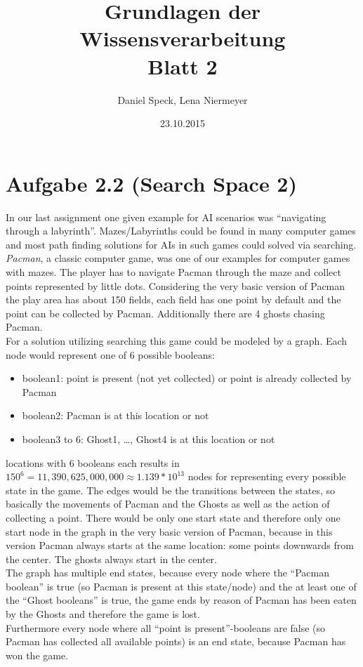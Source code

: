 \documentclass[10pt,a4paper]{article}
\title{\textbf{\huge Grundlagen der Wissensverarbeitung
\\\Large Blatt 2}}
\author{Daniel Speck, Lena Niermeyer}
\date{23.10.2015}
\begin{document}
	\maketitle


			
	
	
	
	
	
	\section*{Aufgabe 2.2 (Search Space 2)}

		In our last assignment one given example for AI scenarios was \enquote{navigating through a labyrinth}. Mazes/Labyrinths could be found in many computer games and most path finding solutions for AIs in such games could solved via searching.
		\\
		\textit{Pacman}, a classic computer game, was one of our examples for computer games with mazes. The player has to navigate Pacman through the maze and collect points represented by little dots. Considering the very basic version of Pacman the play area has about 150 fields, each field has one point by default and the point can be collected by Pacman. Additionally there are 4 ghosts chasing Pacman.
		\\
		For a solution utilizing searching this game could be modeled by a graph. Each node would represent one of 6 possible booleans:
		
		\begin{itemize}
			\item boolean1: point is present (not yet collected) or point is already collected by Pacman
			\item boolean2: Pacman is at this location or not
			\item boolean3 to 6: Ghost1, \dots, Ghost4 is at this location or not
		\end{itemize}
		
		 locations with 6 booleans each results in $150^6 = 11,390,625,000,000 \approx 1.139*10^{13}$ nodes for representing every possible state in the game. The edges would be the transitions between the states, so basically the movements of Pacman and the Ghosts as well as the action of collecting a point. There would be only one start state and therefore only one start node in the graph in the very basic version of Pacman, because in this version Pacman always starts at the same location: some points downwards from the center. The ghosts always start in the center.
		\\
		The graph has multiple end states, because every node where the \enquote{Pacman boolean} is true (so Pacman is present at this state/node) and the at least one of the \enquote{Ghost booleans} is true, the game ends by reason of Pacman has been eaten by the Ghosts and therefore the game is lost.
		\\
		Furthermore every node where all \enquote{point is present}-booleans are false (so Pacman has collected all available points) is an end state, because Pacman has won the game.
		
		
\end{document}
